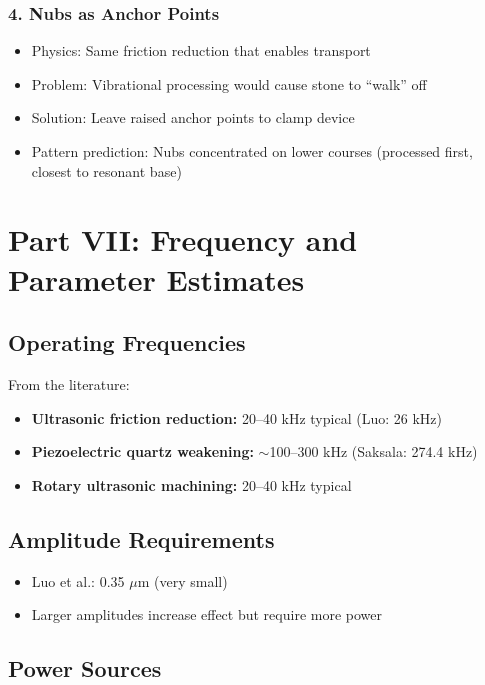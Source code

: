 \documentclass[11pt]{article}
\begin{document}
\subsubsection{4. Nubs as Anchor Points}
\begin{itemize}
    \item Physics: Same friction reduction that enables transport
    \item Problem: Vibrational processing would cause stone to ``walk'' off
    \item Solution: Leave raised anchor points to clamp device
    \item Pattern prediction: Nubs concentrated on lower courses (processed first, closest to resonant base)
\end{itemize}

\section{Part VII: Frequency and Parameter Estimates}

\subsection{Operating Frequencies}

From the literature:
\begin{itemize}
    \item \textbf{Ultrasonic friction reduction:} 20--40 kHz typical (Luo: 26 kHz)
    \item \textbf{Piezoelectric quartz weakening:} $\sim$100--300 kHz (Saksala: 274.4 kHz)
    \item \textbf{Rotary ultrasonic machining:} 20--40 kHz typical
\end{itemize}

\subsection{Amplitude Requirements}

\begin{itemize}
    \item Luo et al.: 0.35 $\mu$m (very small)
    \item Larger amplitudes increase effect but require more power
\end{itemize}

\subsection{Power Sources}
\end{document}
